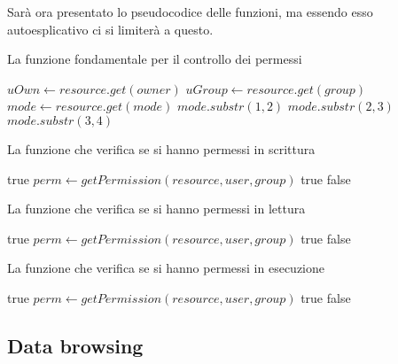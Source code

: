  Sarà ora presentato lo pseudocodice delle funzioni, ma essendo esso autoesplicativo ci si limiterà a questo.   
\begin{algorithm}
\caption{La funzione fondamentale per il controllo dei permessi}
\begin{algorithmic}[5]
\State $uOwn\gets resource.get(owner)$
\State $uGroup\gets resource.get(group)$
\State $mode\gets resource.get(mode)$
	\State \Return $mode.substr(1,2)$
	\State \Return $mode.substr(2,3)$
\Else
	\State \Return $mode.substr(3,4)$
\EndIf
\EndFunction
\end{algorithmic}
\end{algorithm}
\begin{algorithm}
\caption{La funzione che verifica se si hanno permessi in scrittura}
\begin{algorithmic}[5]
	\State \Return true
\EndIf
\State $perm \gets getPermission(resource, user, group)$
	\State \Return true
\EndIf
\State \Return false
\EndFunction
\end{algorithmic}
\end{algorithm}
\begin{algorithm}
\caption{La funzione che verifica se si hanno permessi in lettura}
\begin{algorithmic}[5]
	\State \Return true
\EndIf
\State $perm \gets getPermission(resource, user, group)$
	\State \Return true
\EndIf
\State \Return false
\EndFunction
\end{algorithmic}
\end{algorithm}
   \begin{algorithm}
\caption{La funzione che verifica se si hanno permessi in esecuzione}
\begin{algorithmic}[5]
	\State \Return true
\EndIf
\State $perm \gets getPermission(resource, user, group)$
	\State \Return true
\EndIf
\State \Return false
\EndFunction
\end{algorithmic}
\end{algorithm}
\subsection{Data browsing}

